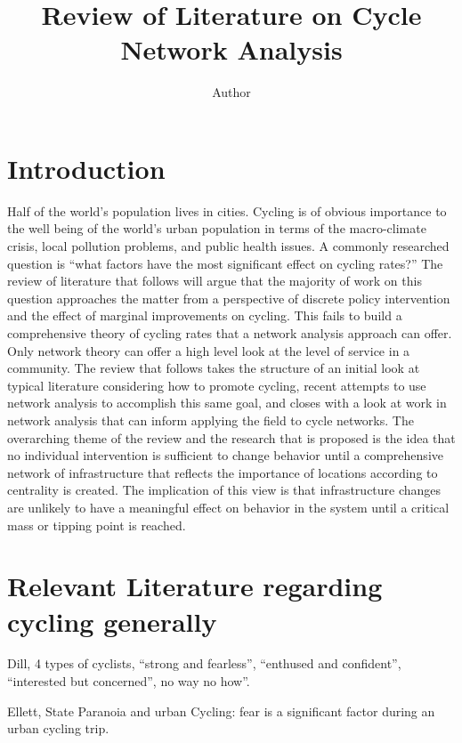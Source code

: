 \documentclass[11pt]{article} %
\title{\vspace{-3.0cm}Review of Literature on Cycle Network Analysis}
\author{Author}
\begin{document}
\maketitle


\section{Introduction}

Half of the world's population lives in cities. Cycling is of obvious importance to the well being of the world's  urban population in terms of the macro-climate crisis, local pollution problems, and public health issues. A commonly researched question is ``what factors have the most significant effect on cycling rates?'' The review of literature that follows will argue that the majority of work on this question approaches the matter from a perspective of discrete policy intervention and the effect of marginal improvements on cycling. This fails to build a comprehensive theory of cycling rates that a network analysis approach can offer. Only network theory can offer a high level look at the level of service in a community. The review that follows takes the structure of an initial look at typical literature considering how to promote cycling, recent attempts to use network analysis to accomplish this same goal, and closes with a look at work in network analysis that can inform applying the field to cycle networks. The overarching theme of the review and the research that is proposed is the idea that no individual intervention is sufficient to change behavior until a comprehensive network of infrastructure that reflects the importance of locations according to centrality is created. The implication of this view is that infrastructure changes are unlikely to have a meaningful effect on behavior in the system until a critical mass or tipping point is reached. 

\section{Relevant Literature regarding cycling generally}

Dill, 4 types of cyclists, ``strong and fearless'', ``enthused and confident'', ``interested but concerned'', no way no how''.   \cite{dill2013four}

Ellett, State Paranoia and urban Cycling: fear is a significant factor during an urban cycling trip. \cite{ellett2018state}
\end{document}
